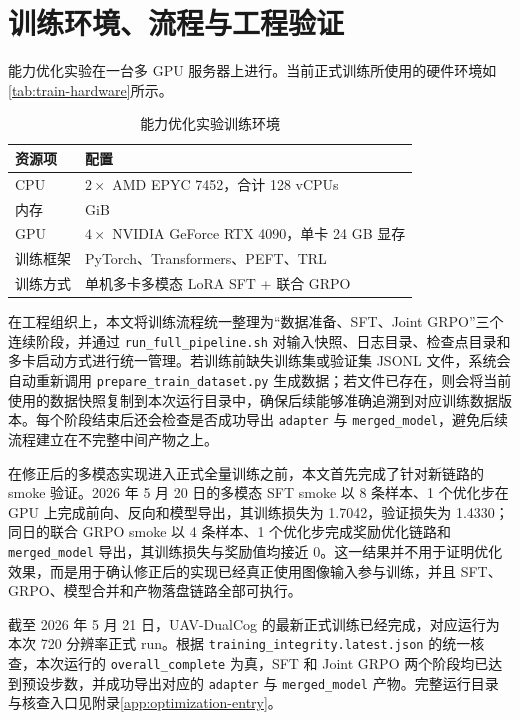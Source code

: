 \FloatBarrier
\section{训练环境、流程与工程验证}

能力优化实验在一台多 GPU 服务器上进行。当前正式训练所使用的硬件环境如\autoref{tab:train-hardware}所示。

\begin{table}[htbp]
    \centering
    \caption{能力优化实验训练环境}
    \label{tab:train-hardware}
    \small
    \begin{tabularx}{\textwidth}{@{}X>{\centering\arraybackslash}p{7.0cm}@{}}
        \toprule
        资源项 & 配置 \\
        \midrule
        CPU & \(2\times\) AMD EPYC 7452，合计 128 vCPUs \\
        内存 & 503 GiB \\
        GPU & \(4\times\) NVIDIA GeForce RTX 4090，单卡 24 GB 显存 \\
        训练框架 & PyTorch、Transformers、PEFT、TRL \\
        训练方式 & 单机多卡多模态 LoRA SFT + 联合 GRPO \\
        \bottomrule
    \end{tabularx}
\end{table}

在工程组织上，本文将训练流程统一整理为“数据准备、SFT、Joint GRPO”三个连续阶段，并通过 \texttt{run\_full\_pipeline.sh} 对输入快照、日志目录、检查点目录和多卡启动方式进行统一管理。若训练前缺失训练集或验证集 JSONL 文件，系统会自动重新调用 \texttt{prepare\_train\_dataset.py} 生成数据；若文件已存在，则会将当前使用的数据快照复制到本次运行目录中，确保后续能够准确追溯到对应训练数据版本。每个阶段结束后还会检查是否成功导出 \texttt{adapter} 与 \texttt{merged\_model}，避免后续流程建立在不完整中间产物之上。

在修正后的多模态实现进入正式全量训练之前，本文首先完成了针对新链路的 smoke 验证。2026 年 5 月 20 日的多模态 SFT smoke 以 8 条样本、1 个优化步在 GPU 上完成前向、反向和模型导出，其训练损失为 1.7042，验证损失为 1.4330；同日的联合 GRPO smoke 以 4 条样本、1 个优化步完成奖励优化链路和 \texttt{merged\_model} 导出，其训练损失与奖励值均接近 0。这一结果并不用于证明优化效果，而是用于确认修正后的实现已经真正使用图像输入参与训练，并且 SFT、GRPO、模型合并和产物落盘链路全部可执行。

截至 2026 年 5 月 21 日，UAV-DualCog 的最新正式训练已经完成，对应运行为本次 720 分辨率正式 run。根据 \texttt{training\_integrity.latest.json} 的统一核查，本次运行的 \texttt{overall\_complete} 为真，SFT 和 Joint GRPO 两个阶段均已达到预设步数，并成功导出对应的 \texttt{adapter} 与 \texttt{merged\_model} 产物。完整运行目录与核查入口见附录\autoref{app:optimization-entry}。

